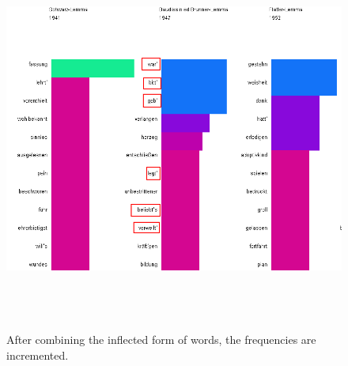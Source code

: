 \begin{figure}[H]
	\centering	
	\includegraphics[width=16cm, height=12cm]{Figs/Marking-Feedback}\\[1ex]
	\caption{} After combining the inflected form of words, the frequencies are incremented.
	\label{fig:feedback}
\end{figure} 




